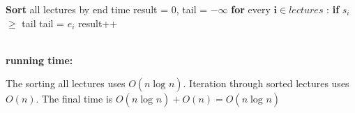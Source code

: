 \documentclass[12pt]{article}
\begin{document}
\begin{algorithm}
\begin{algorithmic}
\State \textbf{Sort} all lectures by end time
\State result = 0, tail = $-\infty$
\State \textbf{for} every $\textbf{i} \in lectures$ :
\State \hspace{0.8cm} \textbf{if} $s_i$ $\geq$ tail
\State \hspace{1.6cm} \textbf{} tail = $e_i$
\State \hspace{1.6cm} \textbf{} result++
\end{algorithmic}
\end{algorithm}
\noindent \\
\textbf{running time:} \par
The sorting all lectures uses $O(n\log_{}{n})$. Iteration through sorted lectures uses $O(n)$.
The final time is $O(n\log_{}{n}) + O(n) = O(n\log_{}{n})$
\end{document}
